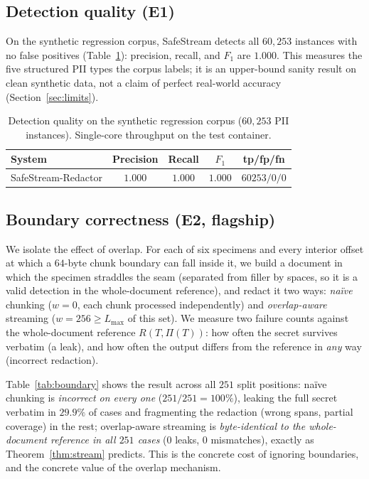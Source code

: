 \documentclass[conference]{IEEEtran}
\begin{document}
\subsection{Detection quality (E1)}

On the synthetic regression corpus, SafeStream detects all $60{,}253$ instances
with no false positives (Table~\ref{tab:quality}): precision, recall, and
$F_1$ are $1.000$. This measures the five structured PII types the corpus labels;
it is an upper-bound sanity result on clean synthetic data, not a claim of perfect
real-world accuracy (Section~\ref{sec:limits}).

\begin{table}[t]
\centering
\caption{Detection quality on the synthetic regression corpus
($60{,}253$ PII instances). Single-core throughput on the test container.}
\label{tab:quality}
\footnotesize
\begin{tabular}{@{}lcccc@{}}
\toprule
System & Precision & Recall & $F_1$ & tp/fp/fn \\
\midrule
SafeStream-Redactor & $1.000$ & $1.000$ & $1.000$ & $60253/0/0$ \\
\bottomrule
\end{tabular}
\end{table}

\subsection{Boundary correctness (E2, flagship)}

We isolate the effect of overlap. For each of six specimens and every interior
offset at which a $64$-byte chunk boundary can fall inside it, we build a document
in which the specimen straddles the seam (separated from filler by spaces, so it
is a valid detection in the whole-document reference), and redact it two ways:
\emph{na\"ive} chunking ($w{=}0$, each chunk processed independently) and
\emph{overlap-aware} streaming ($w{=}256\ge L_{\max}$ of this set). We measure two
failure counts against the whole-document reference $R(T,\Pi(T))$: how often the
secret survives verbatim (a leak), and how often the output differs from the
reference in \emph{any} way (incorrect redaction).

Table~\ref{tab:boundary} shows the result across all $251$ split positions:
na\"ive chunking is \emph{incorrect on every one} ($251/251=100\%$), leaking the
full secret verbatim in $29.9\%$ of cases and fragmenting the redaction (wrong
spans, partial coverage) in the rest; overlap-aware streaming is
\emph{byte-identical to the whole-document reference in all $251$ cases}
($0$ leaks, $0$ mismatches), exactly as Theorem~\ref{thm:stream} predicts. This is
the concrete cost of ignoring boundaries, and the concrete value of the overlap
mechanism.
\end{document}
